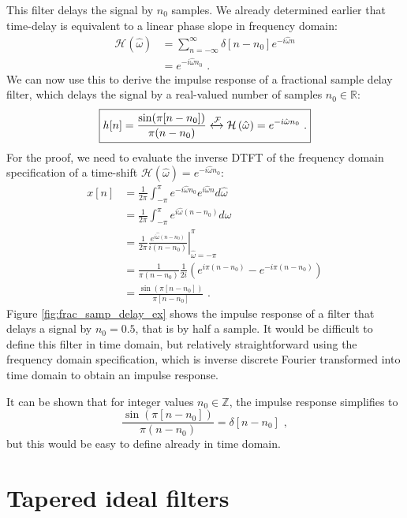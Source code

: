 This filter delays the signal by $n_0$ samples. We already determined earlier that time-delay 
is equivalent to a linear phase slope in
frequency domain:
\begin{align}
\mathcal{H}(\hat{\omega}) &= \sum_{n=-\infty}^{\infty}\delta[n-n_0]e^{-i\hat{\omega}n}\\
                          &=e^{-i\hat{\omega}n_0}\,\,.
\end{align}
We can now use this to derive the impulse response of a fractional sample delay filter, 
which delays the signal by a real-valued number of samples $n_0 \in \mathbb{R}$:
\begin{equation}
\boxed{
h[n] =\frac{\sin(\pi[n-n_0])}{\pi(n-n_0)} \xleftrightarrow{\mathcal{F}} \mathcal{H}\left(\hat{\omega}\right) = e^{-i\hat{\omega}n_0}\,\,.
}
\end{equation}
For the proof, we need to evaluate the inverse DTFT of the frequency domain specification of a time-shift
$\mathcal{H}(\hat{\omega})=e^{-i\hat{\omega}n_0}$:
\begin{align}
x[n] &= \frac{1}{2\pi}\int_{-\pi}^{\pi} e^{-i\hat{\omega}n_0} e^{i\hat{\omega}n}d\hat{\omega}\\ 
&= \frac{1}{2\pi}\int_{-\pi}^{\pi}  e^{i\hat{\omega}(n-n_0)}d\hat{\omega}\\
&=\left.\frac{1}{2\pi} \frac{e^{i\hat{\omega}(n-n_0)}}{i(n-n_0)}\right \vert_{\hat{\omega}=-\pi}^{\pi}\\
&= \frac{1}{\pi(n-n_0)}\frac{1}{2i}(e^{i\pi(n-n_0)}-e^{-i\pi(n-n_0)}) \\
&= \frac{\sin(\pi[n-n_0])}{\pi[n-n_0]}\,\,.
\end{align}
Figure \ref{fig:frac_samp_delay_ex} shows the impulse response of a
filter that delays a signal by $n_0=0.5$, that is by half a sample. It
would be difficult to define this filter in time domain, but
relatively straightforward using the frequency domain specification,
which is inverse discrete Fourier transformed into time domain to obtain
an impulse response.

It can be shown that for integer values $n_0 \in \mathbb{Z}$, the
impulse response simplifies to
\begin{equation}
  \frac{\sin(\pi[n-n_0])}{\pi(n-n_0)}=\delta[n-n_0]\,\,,
\end{equation}
but this would be easy to define already in time domain.


\section{Tapered ideal filters}

